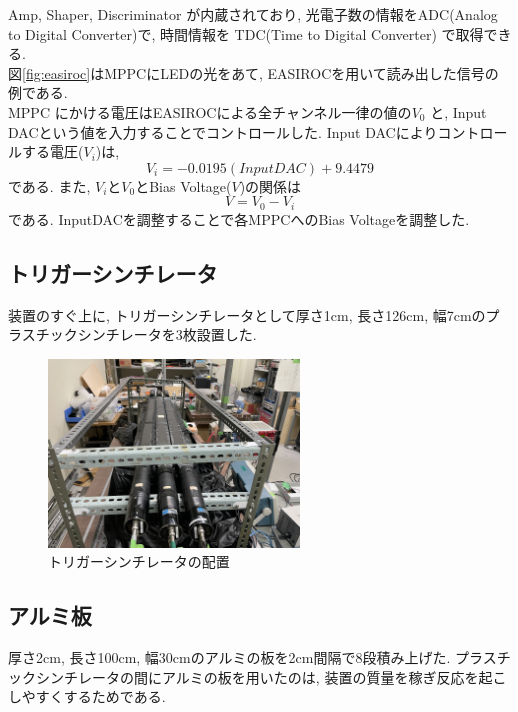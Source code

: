 Amp, Shaper, Discriminator が内蔵されており, 光電子数の情報をADC(Analog to Digital Converter)で, 時間情報を TDC(Time to Digital Converter) で取得できる.
\\
図\ref{fig:easiroc}はMPPCにLEDの光をあて, EASIROCを用いて読み出した信号の例である.
\\
MPPC にかける電圧はEASIROCによる全チャンネル一律の値の$V_0$ と, Input DACという値を入力することでコントロールした.
Input DACによりコントロールする電圧($V_i$)は,
\begin{equation}
    V_i = -0.0195(InputDAC) + 9.4479
\end{equation}
である.
また, $V_i$と$V_0$とBias Voltage($V$)の関係は
\begin{equation}
    V = V_0 - V_i
\end{equation}
である.
InputDACを調整することで各MPPCへのBias Voltageを調整した.

\subsection{トリガーシンチレータ}
装置のすぐ上に, トリガーシンチレータとして厚さ1cm, 長さ126cm, 幅7cmのプラスチックシンチレータを3枚設置した.
\begin{figure}[H]
    \centering
    \includegraphics[height=5cm]{img/Trigger.jpeg}
    \caption{トリガーシンチレータの配置}
    \label{fig:trigger}
\end{figure}

\subsection{アルミ板}
厚さ2cm, 長さ100cm, 幅30cmのアルミの板を2cm間隔で8段積み上げた.
プラスチックシンチレータの間にアルミの板を用いたのは, 装置の質量を稼ぎ反応を起こしやすくするためである.

